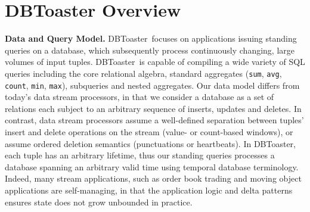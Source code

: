 \documentclass{vldb}
\newcommand{\comment}[1]{}
\newcommand{\compiler}{DBToaster}
\begin{document}
\comment{
In this demonstration we will put our compiler into practice by showcasing its
usage in several performance-hungry applications that are served in limited
fashion by today's data management tools, including algorithmic order book
trading, an integrated approach to data warehouse loading and analysis, as well
as stream processing applications.
As part of this demonstration, we will show our techniques are several orders of
magnitude faster than state-of-the-art   database  and significantly outperform
stream processing engines on such workloads.  In the case of queries on limit
order  book  data  as  required for  supporting  algorithmic  equities trading,
our approach currently stands alone in its ability to support realistic  data
rates  on contemporary hardware without  resorting to very substantial computing
clusters. Indeed, the memory consumption of our main-memory techniques is
sufficiently low to support applications such as data warehouse loading.
}

\section{DBToaster Overview}

\noindent\textbf{Data and Query Model.}
\compiler\ focuses on applications issuing standing queries on a database, which
subsequently process continuously changing, large volumes of input tuples.
\compiler\ is capable of compiling a wide variety of SQL queries including the
core relational algebra, standard aggregates (\texttt{sum}, \texttt{avg},
\texttt{count}, \texttt{min}, \texttt{max}), subqueries and nested aggregates.
Our data model differs from today's data stream processors, in that we consider a
database as a set of relations each subject to an arbitrary sequence of inserts,
updates and deletes. In contrast, data stream processors assume a well-defined
separation between tuples' insert and delete operations on the stream (value- or
count-based windows), or assume ordered deletion semantics (punctuations or
heartbeats). In \compiler, each tuple has an arbitrary lifetime, thus our
standing queries processes a database spanning an arbitrary valid time using
temporal database terminology. Indeed, many stream applications, such as
order book trading and moving object applications are self-managing, in that the
application logic and delta patterns ensures state does not grow unbounded in
practice.
\end{document}
